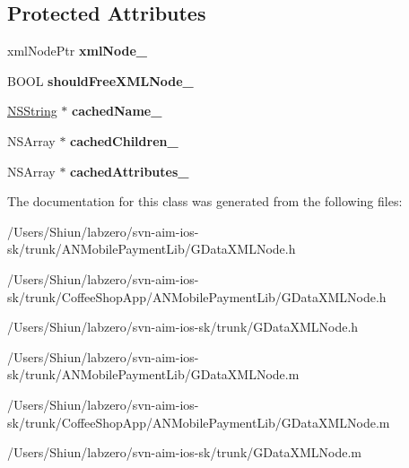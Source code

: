 \subsection*{Protected Attributes}
\begin{DoxyCompactItemize}
\item 
\hypertarget{interface_g_data_x_m_l_node_acfd13d67dcb0ed8011df204c36c88d6f}{
xmlNodePtr {\bfseries xmlNode\_\-}}
\label{interface_g_data_x_m_l_node_acfd13d67dcb0ed8011df204c36c88d6f}

\item 
\hypertarget{interface_g_data_x_m_l_node_af6ca9b5845f17e614acc517388e1bfd5}{
BOOL {\bfseries shouldFreeXMLNode\_\-}}
\label{interface_g_data_x_m_l_node_af6ca9b5845f17e614acc517388e1bfd5}

\item 
\hypertarget{interface_g_data_x_m_l_node_af77fc856f14425ab4c29913a54a33756}{
\hyperlink{class_n_s_string}{NSString} $\ast$ {\bfseries cachedName\_\-}}
\label{interface_g_data_x_m_l_node_af77fc856f14425ab4c29913a54a33756}

\item 
\hypertarget{interface_g_data_x_m_l_node_a9bab96e775ed152cfa531afdbbed7f5e}{
NSArray $\ast$ {\bfseries cachedChildren\_\-}}
\label{interface_g_data_x_m_l_node_a9bab96e775ed152cfa531afdbbed7f5e}

\item 
\hypertarget{interface_g_data_x_m_l_node_a431206621996659c8fa08d9cb0bc679c}{
NSArray $\ast$ {\bfseries cachedAttributes\_\-}}
\label{interface_g_data_x_m_l_node_a431206621996659c8fa08d9cb0bc679c}

\end{DoxyCompactItemize}


The documentation for this class was generated from the following files:\begin{DoxyCompactItemize}
\item 
/Users/Shiun/labzero/svn-\/aim-\/ios-\/sk/trunk/ANMobilePaymentLib/GDataXMLNode.h\item 
/Users/Shiun/labzero/svn-\/aim-\/ios-\/sk/trunk/CoffeeShopApp/ANMobilePaymentLib/GDataXMLNode.h\item 
/Users/Shiun/labzero/svn-\/aim-\/ios-\/sk/trunk/GDataXMLNode.h\item 
/Users/Shiun/labzero/svn-\/aim-\/ios-\/sk/trunk/ANMobilePaymentLib/GDataXMLNode.m\item 
/Users/Shiun/labzero/svn-\/aim-\/ios-\/sk/trunk/CoffeeShopApp/ANMobilePaymentLib/GDataXMLNode.m\item 
/Users/Shiun/labzero/svn-\/aim-\/ios-\/sk/trunk/GDataXMLNode.m\end{DoxyCompactItemize}

